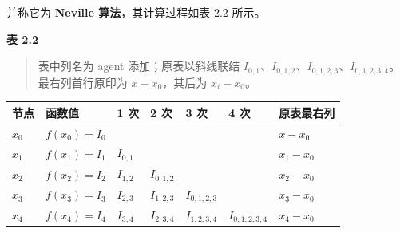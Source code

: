 \documentclass[
  10pt,
  fontset=fandol]{ctexart}
\newcounter{none} %
\begin{document}
并称它为 \textbf{Neville 算法}，其计算过程如表 2.2 所示。

\textbf{表 2.2}

\begin{quote}
表中列名为 agent 添加；原表以斜线联结 \(I_{0,1}\)、\(I_{0,1,2}\)、\(I_{0,1,2,3}\)、\(I_{0,1,2,3,4}\)。最右列首行原印为 \(x-x_0\)，其后为 \(x_i-x_0\)。
\end{quote}

{\def\LTcaptype{none} %
\begin{longtable}[]{@{}
  >{\raggedright\arraybackslash}p{}
  >{\raggedright\arraybackslash}p{}
  >{\raggedright\arraybackslash}p{}
  >{\raggedright\arraybackslash}p{}
  >{\raggedright\arraybackslash}p{}
  >{\raggedright\arraybackslash}p{}
  >{\raggedright\arraybackslash}p{}@{}}
\toprule\noalign{}
\begin{minipage}[b]{\linewidth}\raggedright
节点
\end{minipage} & \begin{minipage}[b]{\linewidth}\raggedright
函数值
\end{minipage} & \begin{minipage}[b]{\linewidth}\raggedright
1 次
\end{minipage} & \begin{minipage}[b]{\linewidth}\raggedright
2 次
\end{minipage} & \begin{minipage}[b]{\linewidth}\raggedright
3 次
\end{minipage} & \begin{minipage}[b]{\linewidth}\raggedright
4 次
\end{minipage} & \begin{minipage}[b]{\linewidth}\raggedright
原表最右列
\end{minipage} \\
\midrule\noalign{}
\endhead
\bottomrule\noalign{}
\endlastfoot
\(x_0\) & \(f(x_0)=I_0\) & & & & & \(x-x_0\) \\
\(x_1\) & \(f(x_1)=I_1\) & \(I_{0,1}\) & & & & \(x_1-x_0\) \\
\(x_2\) & \(f(x_2)=I_2\) & \(I_{1,2}\) & \(I_{0,1,2}\) & & & \(x_2-x_0\) \\
\(x_3\) & \(f(x_3)=I_3\) & \(I_{2,3}\) & \(I_{1,2,3}\) & \(I_{0,1,2,3}\) & & \(x_3-x_0\) \\
\(x_4\) & \(f(x_4)=I_4\) & \(I_{3,4}\) & \(I_{2,3,4}\) & \(I_{1,2,3,4}\) & \(I_{0,1,2,3,4}\) & \(x_4-x_0\) \\
\end{longtable}
}
\end{document}
